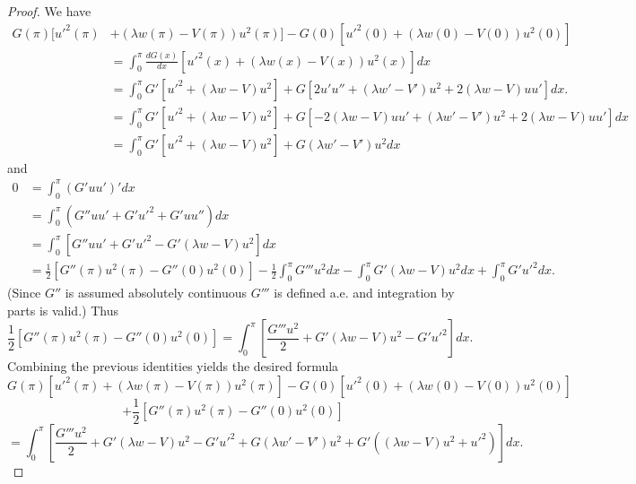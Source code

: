 \documentclass[12pt,a4paper]{amsart}
\begin{document}
\begin{proof}  
We have
\begin{align*}
G(\pi)[u'^{2}(\pi)&+(\lambda w(\pi)-V(\pi))u^{2}(\pi)]-G(0)[u'^{2}(0)+(\lambda w(0)-V(0))u^{2}(0)]\\
 &=\int_{0}^{\pi}\frac{dG(x)}{dx}[u'^{2}(x)+(\lambda w(x)-V(x))u^{2}(x)]dx  \\
&=\int_{0}^{\pi}G'[u'^{2}+(\lambda w-V)u^{2}]+G[2u'u''+(\lambda w'-V')u^{2}+2(\lambda w-V)uu']dx.\\
&=\int_{0}^{\pi}G'[u'^{2}+(\lambda w-V)u^{2}]+G[-2(\lambda w-V)uu'+(\lambda w'-V')u^{2}+2(\lambda w-V)uu']dx\\
&=\int_{0}^{\pi}G'[u'^{2}+(\lambda w-V)u^{2}]+G(\lambda w'-V')u^{2}dx
\end{align*}
and 
\begin{align*}
0 &=\int_{0}^{\pi}(G'uu')'dx\\
&=\int_{0}^{\pi}(G''uu'+G'u'^{2}+G'uu'')dx\\
&=\int_{0}^{\pi}[G''uu'+G'u'^{2}-G'(\lambda w-V)u^{2}]dx\\
&=\frac{1}{2}[G''(\pi)u^{2}(\pi)-G''(0)u^{2}(0)]-\frac{1}{2}\int_{0}^{\pi}G'''u^{2}dx-\int_{0}^{\pi}G'(\lambda w-V)u^{2}dx+\int_{0}^{\pi}G'u'^{2}dx.
\end{align*}
(Since $G''$ is assumed absolutely continuous $G'''$ is defined a.e. and integration by parts is valid.)  Thus
$$\frac{1}{2}[G''(\pi)u^{2}(\pi)-G''(0)u^{2}(0)]=\int_{0}^{\pi}
\left[\frac{G'''u^{2}}{2}+G'(\lambda w-V)u^{2}-G'u'^{2}\right]dx.
$$
\noindent Combining the previous identities yields the desired formula
 $$ G(\pi)[u'^{2}(\pi)+(\lambda w(\pi)-V(\pi))u^{2}(\pi)]-G(0)[u'^{2}(0)+(\lambda w(0)-V(0))u^{2}(0)]$$
$$ + \dfrac{1}{2}[G''(\pi)u^{2}(\pi)-G''(0)u^{2}(0)]$$
$$=\int_{0}^{\pi}\left[\frac{G'''u^{2}}{2}+G'(\lambda w-V)u^{2}-G'u'^{2}+G(\lambda w'-V')u^{2}+G'((\lambda w-V)u^{2}+u'^{2})\right]dx. $$
\end{proof}


\end{document}

